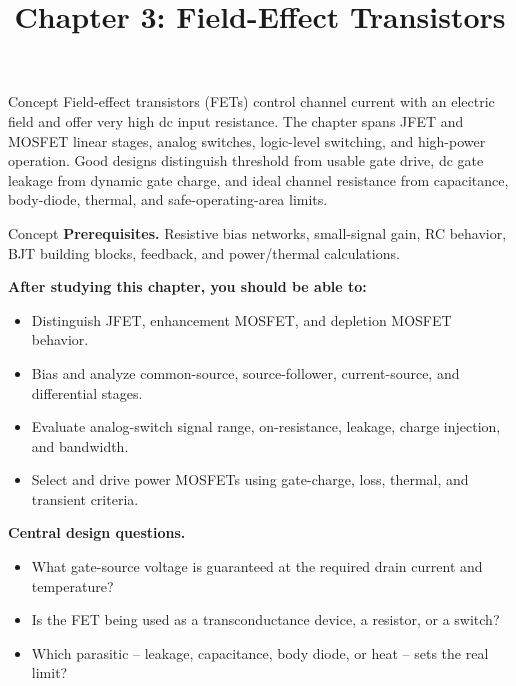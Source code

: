 \documentclass[10pt,letterpaper]{article}
\title{Chapter 3: Field-Effect Transistors}
\author{}
\date{}
\begin{document}
\maketitle

\begin{CornellOverviewBox}{Concept}
Field-effect transistors (FETs) control channel current with an electric field and offer very high dc input resistance. The chapter spans JFET and MOSFET linear stages, analog switches, logic-level switching, and high-power operation. Good designs distinguish threshold from usable gate drive, dc gate leakage from dynamic gate charge, and ideal channel resistance from capacitance, body-diode, thermal, and safe-operating-area limits.
\end{CornellOverviewBox}
\begin{CornellOverviewBox}{Concept}
\textbf{Prerequisites.} Resistive bias networks, small-signal gain, RC behavior, BJT building blocks, feedback, and power/thermal calculations.

\textbf{After studying this chapter, you should be able to:}
\begin{itemize}
  \item Distinguish JFET, enhancement MOSFET, and depletion MOSFET behavior.
  \item Bias and analyze common-source, source-follower, current-source, and differential stages.
  \item Evaluate analog-switch signal range, on-resistance, leakage, charge injection, and bandwidth.
  \item Select and drive power MOSFETs using gate-charge, loss, thermal, and transient criteria.
\end{itemize}\textbf{Central design questions.}
\begin{itemize}
  \item What gate-source voltage is guaranteed at the required drain current and temperature?
  \item Is the FET being used as a transconductance device, a resistor, or a switch?
  \item Which parasitic -- leakage, capacitance, body diode, or heat -- sets the real limit?
\end{itemize}\end{CornellOverviewBox}
\end{document}
